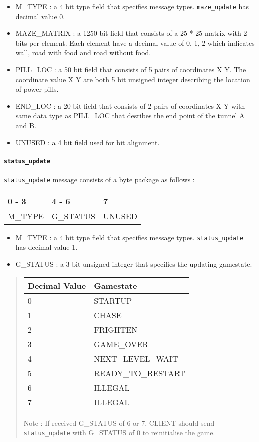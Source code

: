 \documentclass[]{article}
\let\oldparagraph\paragraph
\renewcommand{\paragraph}[1]{\oldparagraph{#1}\mbox{}}
\begin{document}
\begin{itemize}
\item
  M\_TYPE : a 4 bit type field that specifies message types.
  \texttt{maze\_update} has decimal value 0.
\item
  MAZE\_MATRIX : a 1250 bit field that consists of a 25 * 25 matrix with
  2 bits per element. Each element have a decimal value of 0, 1, 2 which
  indicates wall, road with food and road without food.
\item
  PILL\_LOC : a 50 bit field that consists of 5 pairs of coordinates X
  Y. The coordinate value X Y are both 5 bit unsigned integer describing
  the location of power pills.
\item
  END\_LOC : a 20 bit field that consists of 2 pairs of coordinates X Y
  with same data type as PILL\_LOC that desribes the end point of the
  tunnel A and B.
\item
  UNUSED : a 4 bit field used for bit alignment.
\end{itemize}

\hypertarget{status_update}{%
\paragraph{\texorpdfstring{\texttt{status\_update}}{status\_update}}\label{status_update}}

\texttt{status\_update} message consists of a byte package as follows :

\begin{longtable}[]{@{}lll@{}}
\toprule
0 - 3 & 4 - 6 & 7\tabularnewline
\midrule
\endhead
M\_TYPE & G\_STATUS & UNUSED\tabularnewline
\bottomrule
\end{longtable}

\begin{itemize}
\item
  M\_TYPE : a 4 bit type field that specifies message types.
  \texttt{status\_update} has decimal value 1.
\item
  G\_STATUS : a 3 bit unsigned integer that specifies the updating
  gamestate.
\end{itemize}

\begin{quote}
\begin{longtable}[]{@{}ll@{}}
\toprule
Decimal Value & Gamestate\tabularnewline
\midrule
\endhead
0 & STARTUP\tabularnewline
1 & CHASE\tabularnewline
2 & FRIGHTEN\tabularnewline
3 & GAME\_OVER\tabularnewline
4 & NEXT\_LEVEL\_WAIT\tabularnewline
5 & READY\_TO\_RESTART\tabularnewline
6 & ILLEGAL\tabularnewline
7 & ILLEGAL\tabularnewline
\bottomrule
\end{longtable}

Note : If received G\_STATUS of 6 or 7, CLIENT should send
\texttt{status\_update} with G\_STATUS of 0 to reinitialise the game.
\end{quote}
\end{document}

